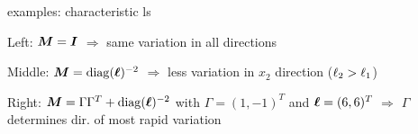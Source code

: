\documentclass[11pt,compress,t,notes=noshow, xcolor=table]{beamer}
\begin{document}
\begin{framei}{examples: characteristic ls}



\item Left: $\bm{M} = \boldsymbol{I}$ $\Rightarrow$ same variation in all directions
\item Middle: $\bm{M} = \operatorname{diag}(\bm{\ell})^{-2}$ $\Rightarrow$ less variation in $x_2$ direction ($\ell_2 > \ell_1$)
\item Right: $\bm{M} = \Gamma \Gamma^T + \operatorname{diag}(\bm{\ell})^{-2}$ with $\Gamma = (1, -1)^T$ and $\bm{\ell} = (6, 6)^T$ $\Rightarrow$ $\Gamma$ determines dir. of most rapid variation
\vfill
{}

\end{framei}

\endlecture
\end{document}
